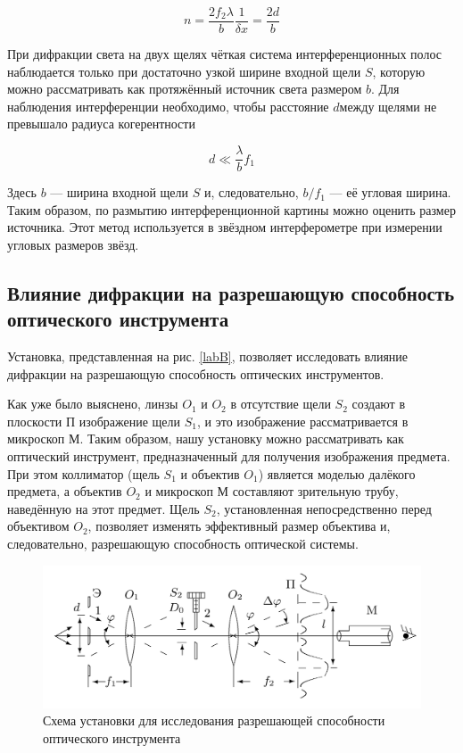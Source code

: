 \documentclass[a4paper,12pt]{article} %
\begin{document}
\begin{equation}\label{n}
n = \dfrac{2f_2 \lambda}{b} \dfrac{1}{\delta x} = \dfrac{2d}{b}
\end{equation}

При дифракции света на двух щелях чёткая система интерференционных полос наблюдается только при достаточно узкой ширине входной щели $ S $, которую можно рассматривать как протяжённый источник света размером $ b $. Для наблюдения интерференции необходимо, чтобы расстояние $ d $между щелями не превышало радиуса когерентности

\begin{equation}\label{}
d \ll \dfrac{\lambda}{b} f_1
\end{equation}

Здесь $ b $ --- ширина входной щели $ S $ и, следовательно, $  b/f_1 $ --- её угловая ширина. Таким образом, по размытию интерференционной картины можно оценить размер источника. Этот метод используется в звёздном интерферометре при измерении угловых размеров звёзд.

\subsection{Влияние дифракции на разрешающую способность оптического инструмента}

Установка, представленная на рис. \ref{labB}, позволяет исследовать влияние дифракции на разрешающую способность оптических инструментов.

Как уже было выяснено, линзы $O_1$ и $ O_2$ в отсутствие щели $S_2$ создают в плоскости П изображение щели $S_1$, и это изображение рассматривается в микроскоп М. Таким образом, нашу установку можно рассматривать как оптический инструмент, предназначенный для получения изображения предмета. При этом коллиматор (щель $S_1$ и объектив $O_1$) является моделью далёкого предмета, а объектив $O_2$ и микроскоп М составляют зрительную трубу, наведённую на этот предмет.
Щель $S_2$, установленная непосредственно перед объективом $O_2$, позволяет изменять эффективный размер объектива и, следовательно, разрешающую способность оптической системы.

\begin{figure}[H]
	\centering
	\includegraphics[scale=0.15]{dlab.jpeg}
	\caption{Схема установки для исследования разрешающей
		способности оптического инструмента}
	\label{labG}
\end{figure}
\end{document}
